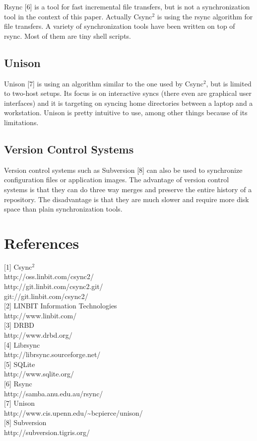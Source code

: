 \documentclass[a4paper,twocolumn]{article}
\def\csync2{{\sc Csync$^{2}$}}
\begin{document}
Rsync [6] is a tool for fast incremental file transfers, but is not a
synchronization tool in the context of this paper. Actually \csync2 is
using the rsync algorithm for file transfers. A variety of synchronization
tools have been written on top of rsync. Most of them are tiny shell scripts.

\subsection{Unison}

Unison [7] is using an algorithm similar to the one used by \csync2, but is
limited to two-host setups. Its focus is on interactive syncs (there even are
graphical user interfaces) and it is targeting on syncing home directories
between a laptop and a workstation. Unison is pretty intuitive to use, among
other things because of its limitations.

\subsection{Version Control Systems}

Version control systems such as Subversion [8] can also be used to synchronize
configuration files or application images. The advantage of version control
systems is that they can do three way merges and preserve the entire history
of a repository. The disadvantage is that they are much slower and require more
disk space than plain synchronization tools.

\section{References}

{[1]} \csync2 \\
http://oss.linbit.com/csync2/ \\
http://git.linbit.com/csync2.git/ \\
git://git.linbit.com/csync2/
\medskip \\
{[2]} LINBIT Information Technologies \\
http://www.linbit.com/
\medskip \\
{[3]} DRBD \\
http://www.drbd.org/
\medskip \\
{[4]} Librsync \\
http://librsync.sourceforge.net/
\medskip \\
{[5]} SQLite \\
http://www.sqlite.org/
\medskip \\
{[6]} Rsync \\
http://samba.anu.edu.au/rsync/
\medskip \\
{[7]} Unison \\
http://www.cis.upenn.edu/\textasciitilde{}bcpierce/unison/
\medskip \\
{[8]} Subversion \\
http://subversion.tigris.org/
\end{document}
